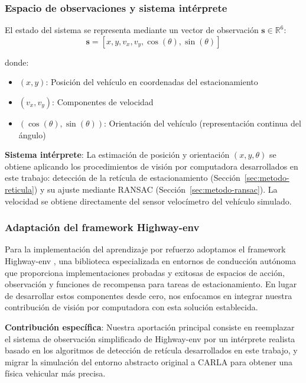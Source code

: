 \subsubsection{Espacio de observaciones y sistema intérprete}\label{subsec:rl-observations}
\noindent
El estado del sistema se representa mediante un vector de observación $\mathbf{s} \in \mathbb{R}^6$:
\begin{equation}
    \mathbf{s} = [x, y, v_x, v_y, \cos(\theta), \sin(\theta)]
\end{equation}

donde:
\begin{itemize}
    \item $(x, y)$: Posición del vehículo en coordenadas del estacionamiento
    \item $(v_x, v_y)$: Componentes de velocidad
    \item $(\cos(\theta), \sin(\theta))$: Orientación del vehículo (representación continua del ángulo)
\end{itemize}

\noindent
\textbf{Sistema intérprete}: La estimación de posición y orientación $(x, y, \theta)$ se obtiene
aplicando los procedimientos de visión por computadora desarrollados en este trabajo:
detección de la retícula de estacionamiento (Sección~\ref{sec:metodo-reticula}) y
su ajuste mediante RANSAC (Sección~\ref{sec:metodo-ransac}). La velocidad se obtiene
directamente del sensor velocímetro del vehículo simulado.

\subsubsection{Adaptación del framework Highway-env}\label{subsec:rl-highway-adaptation}
\noindent
Para la implementación del aprendizaje por refuerzo adoptamos el framework Highway-env \cite{highway-env},
una biblioteca especializada en entornos de conducción autónoma que proporciona implementaciones
probadas y exitosas de espacios de acción, observación y funciones de recompensa para tareas
de estacionamiento. En lugar de desarrollar estos componentes desde cero, nos enfocamos en
integrar nuestra contribución de visión por computadora con esta solución establecida.

\noindent
\textbf{Contribución específica}: Nuestra aportación principal consiste en reemplazar el
sistema de observación simplificado de Highway-env por un intérprete realista basado en
los algoritmos de detección de retícula desarrollados en este trabajo, y migrar la
simulación del entorno abstracto original a CARLA para obtener una física vehicular
más precisa.

